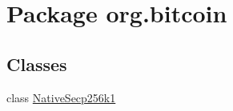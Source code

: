\hypertarget{namespaceorg_1_1bitcoin}{}\section{Package org.\+bitcoin}
\label{namespaceorg_1_1bitcoin}
\subsection*{Classes}
\begin{DoxyCompactItemize}
\item 
class \hyperlink{classorg_1_1bitcoin_1_1_native_secp256k1}{Native\+Secp256k1}
\end{DoxyCompactItemize}
